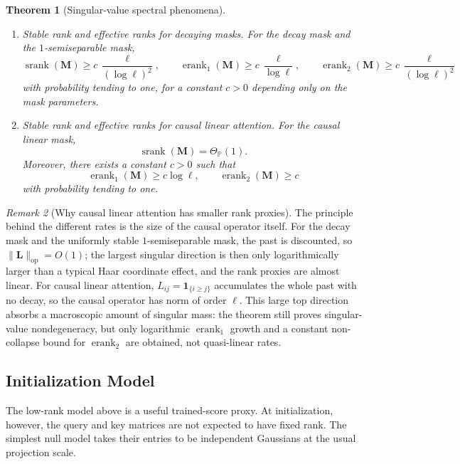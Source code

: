 \documentclass{article}
\newcommand{\Prob}{\mathbb{P}}
\newcommand{\srank}{\operatorname{srank}}
\newcommand{\erank}{\operatorname{erank}}
\newcommand{\op}{\operatorname{op}}
\newcommand{\one}{\mathbf{1}}
\newcommand{\bM}{\mathbf{M}}
\newcommand{\bL}{\mathbf{L}}
\newtheorem{theorem}{Theorem}
\theoremstyle{definition}
\theoremstyle{remark}
\newtheorem{remark}[theorem]{Remark}
\begin{document}
\begin{theorem}[Singular-value spectral phenomena]
\begin{enumerate}
\item[(ii)] Stable rank and effective ranks for decaying masks.  For the decay
mask and the $1$-semiseparable mask,
\begin{equation}
    \srank(\bM)
    \geq
    c\,\frac{\ell}{(\log\ell)^2},
    \qquad
    \erank_{1}(\bM)
    \geq
    c\,\frac{\ell}{\log\ell},
    \qquad
    \erank_{2}(\bM)
    \geq
    c\,\frac{\ell}{(\log\ell)^2}
    \label{eq:stable-mask-singular-ranks}
\end{equation}
with probability tending to one, for a constant $c>0$ depending only on the
mask parameters.

\item[(iii)] Stable rank and effective ranks for causal linear attention.  For
the causal linear mask,
\[
    \srank(\bM)=\Theta_{\Prob}(1).
\]
Moreover, there exists a constant $c>0$ such that
\begin{equation}
    \erank_{1}(\bM)\geq c\log\ell,
    \qquad
    \erank_{2}(\bM)\geq c
    \label{eq:linear-mask-singular-ranks}
\end{equation}
with probability tending to one.
\end{enumerate}
\label{thm:singular-spectral-phenomena}
\end{theorem}

\begin{remark}[Why causal linear attention has smaller rank proxies]
The principle behind the different rates is the size of the causal operator
itself.  For the decay mask and the uniformly stable $1$-semiseparable mask,
the past is discounted, so $\|\bL\|_{\op}=O(1)$; the largest singular direction
is then only logarithmically larger than a typical Haar coordinate effect, and
the rank proxies are almost linear.  For causal linear attention,
$L_{ij}=\one_{\{i\geq j\}}$ accumulates the whole past with no decay, so the
causal operator has norm of order $\ell$.  This large top direction absorbs a
macroscopic amount of singular mass: the theorem still proves
singular-value nondegeneracy, but only logarithmic $\erank_1$ growth and a
constant non-collapse bound for $\erank_2$ are obtained, not quasi-linear
rates.
\label{rem:linear-attention-rank-growth}
\end{remark}

\subsection{Initialization Model}
\label{sec:initialization-model}

The low-rank model above is a useful trained-score proxy.  At initialization,
however, the query and key matrices are not expected to have fixed rank.  The
simplest null model takes their entries to be independent Gaussians at the
usual projection scale.
\end{document}
